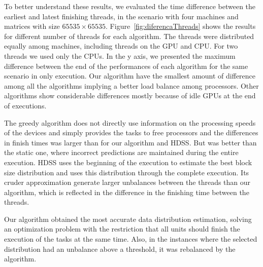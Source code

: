 \documentclass[journal]{IEEEtran}
\begin{document}

%	

To better understand these results, we evaluated the time difference between the
earliest and latest finishing threads, in the scenario with four machines and
matrices with size $65535 \times 65535$.  Figure~\ref{fig:diferencaThreads}
shows the results for different number of threads for each algorithm. The
threads were distributed equally among machines, including threads on the GPU
and CPU. For two threads we used only the CPUs. In the y axis, we presented the
maximum difference between the end of the performances of each algorithm for the
same scenario in only execution. Our algorithm have the smallest amount of difference among all
the algorithms implying a better load balance among processors. Other algorithms
show considerable differences mostly because of idle GPUs at the end of
executions.

The greedy algorithm does not directly use information on the processing speeds
of the devices and simply provides the tasks to free processors and the
differences in finish times was larger than for our algorithm and HDSS. But was
better than the static one, where incorrect predictions are maintained during
the entire execution. HDSS uses the beginning of the execution to estimate the
best block size distribution and uses this distribution through the complete
execution. Its cruder approximation generate larger unbalances between the
threads than our algorithm, which is reflected in the difference in the
finishing time between the threads.

Our algorithm obtained the most accurate data distribution estimation, solving
an optimization problem with the restriction that all units should finish the
execution of the tasks at the same time. Also, in the instances where the
selected distribution had an unbalance above a threshold, it was rebalanced by
the algorithm.
\end{document}

